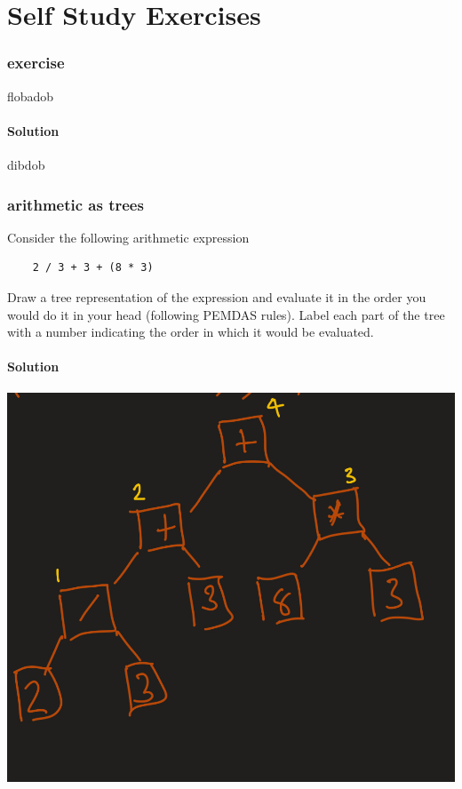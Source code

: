 \documentclass[twoside=false, DIV=14]{scrartcl}
\begin{document}
\newpage
\part*{Self Study Exercises}
\section*{exercise}
flobadob

\subsection*{Solution}
dibdob


\section*{arithmetic as trees}
Consider the following arithmetic expression
\begin{lstlisting}
    2 / 3 + 3 + (8 * 3)
\end{lstlisting}
Draw a tree representation of the expression and evaluate it in the order you would do it in your head (following PEMDAS rules).  Label each part of the tree with a number indicating the order in which it would be evaluated.
\subsection*{Solution}
  \includegraphics[width=\textwidth]{tree.jpeg}
\end{document}
